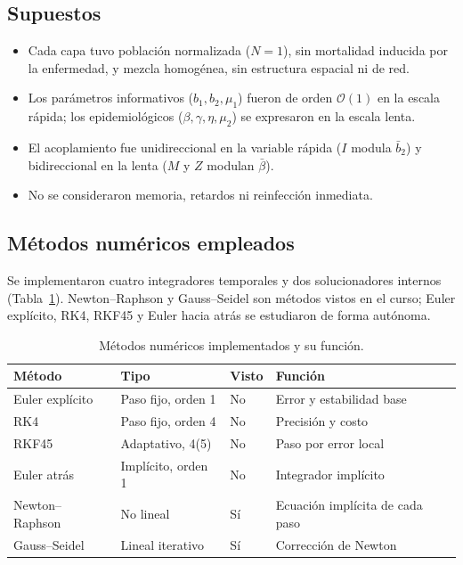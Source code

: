 \subsection{Supuestos}
\begin{itemize}[itemsep=2pt, topsep=4pt, parsep=0pt]
    \item Cada capa tuvo población normalizada ($N=1$), sin mortalidad inducida por la enfermedad, y mezcla homogénea, sin estructura espacial ni de red.
    \item Los parámetros informativos ($b_1,b_2,\mu_1$) fueron de orden $\mathcal O(1)$ en la escala rápida; los epidemiológicos ($\beta,\gamma,\eta,\mu_2$) se expresaron en la escala lenta.
    \item El acoplamiento fue unidireccional en la variable rápida ($I$ modula $\bar b_2$) y bidireccional en la lenta ($M$ y $Z$ modulan $\bar\beta$).
    \item No se consideraron memoria, retardos ni reinfección inmediata.
\end{itemize}

\subsection{Métodos numéricos empleados}
Se implementaron cuatro integradores temporales y dos solucionadores internos (Tabla~\ref{tab:metodos}). Newton--Raphson y Gauss--Seidel son métodos vistos en el curso; Euler explícito, RK4, RKF45 y Euler hacia atrás se estudiaron de forma autónoma.

\begin{table}[!htb]
\centering
\caption{Métodos numéricos implementados y su función.}
\label{tab:metodos}
\scriptsize
\setlength{\tabcolsep}{3pt}
\renewcommand{\arraystretch}{1.12}
\begin{tabularx}{\columnwidth}{@{}p{1.6cm}p{1.9cm}p{0.7cm}X@{}}
\toprule
\textbf{Método} & \textbf{Tipo} & \textbf{Visto} & \textbf{Función} \\
\midrule
Euler explícito & Paso fijo, orden 1 & No & Error y estabilidad base \\
RK4 & Paso fijo, orden 4 & No & Precisión y costo \\
RKF45 & Adaptativo, 4(5) & No & Paso por error local \\
Euler atrás & Implícito, orden 1 & No & Integrador implícito \\
Newton--Raphson & No lineal & Sí & Ecuación implícita de cada paso \\
Gauss--Seidel & Lineal iterativo & Sí & Corrección de Newton \\
\bottomrule
\end{tabularx}
\end{table}

